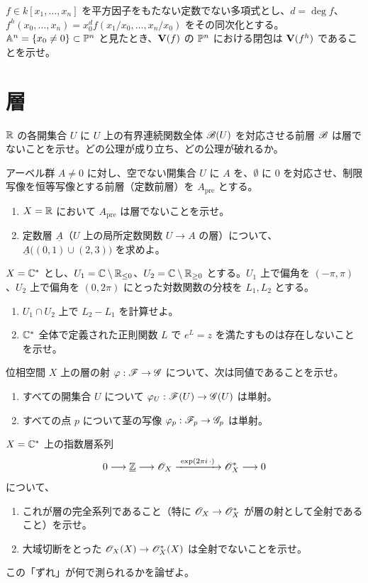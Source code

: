 $f\in k[x_1,\dots,x_n]$ を平方因子をもたない定数でない多項式とし、$d=\deg f$、$f^h(x_0,\dots,x_n)=x_0^d f(x_1/x_0,\dots,x_n/x_0)$ をその同次化とする。$\mathbb{A}^n=\{x_0\neq 0\}\subset\mathbb{P}^n$ と見たとき、$\mathbf{V}(f)$ の $\mathbb{P}^n$ における閉包は $\mathbf{V}(f^h)$ であることを示せ。

\section{層}

$\mathbb{R}$ の各開集合 $U$ に $U$ 上の有界連続関数全体 $\mathscr{B}(U)$ を対応させる前層 $\mathscr{B}$ は層でないことを示せ。どの公理が成り立ち、どの公理が破れるか。

アーベル群 $A\neq 0$ に対し、空でない開集合 $U$ に $A$ を、$\emptyset$ に $0$ を対応させ、制限写像を恒等写像とする前層（定数前層）を $A_{\mathrm{pre}}$ とする。
\begin{enumerate}
  \item $X=\mathbb{R}$ において $A_{\mathrm{pre}}$ は層でないことを示せ。
  \item 定数層 $\underline{A}$（$U$ 上の局所定数関数 $U\to A$ の層）について、$\underline{A}\bigl((0,1)\cup(2,3)\bigr)$ を求めよ。
\end{enumerate}

$X=\mathbb{C}^*$ とし、$U_1=\mathbb{C}\setminus\mathbb{R}_{\leq 0}$、$U_2=\mathbb{C}\setminus\mathbb{R}_{\geq 0}$ とする。$U_1$ 上で偏角を $(-\pi,\pi)$、$U_2$ 上で偏角を $(0,2\pi)$ にとった対数関数の分枝を $L_1,L_2$ とする。
\begin{enumerate}
  \item $U_1\cap U_2$ 上で $L_2-L_1$ を計算せよ。
  \item $\mathbb{C}^*$ 全体で定義された正則関数 $L$ で $e^{L}=z$ を満たすものは存在しないことを示せ。
\end{enumerate}

位相空間 $X$ 上の層の射 $\varphi:\mathscr{F}\to\mathscr{G}$ について、次は同値であることを示せ。
\begin{enumerate}
  \item すべての開集合 $U$ について $\varphi_U:\mathscr{F}(U)\to\mathscr{G}(U)$ は単射。
  \item すべての点 $p$ について茎の写像 $\varphi_p:\mathscr{F}_p\to\mathscr{G}_p$ は単射。
\end{enumerate}

$X=\mathbb{C}^*$ 上の指数層系列
\[
  0\longrightarrow \underline{\mathbb{Z}}\longrightarrow \mathscr{O}_X\xrightarrow{\ \exp(2\pi i\,\cdot)\ }\mathscr{O}_X^*\longrightarrow 0
\]
について、
\begin{enumerate}
  \item これが層の完全系列であること（特に $\mathscr{O}_X\to\mathscr{O}_X^*$ が層の射として全射であること）を示せ。
  \item 大域切断をとった $\mathscr{O}_X(X)\to\mathscr{O}_X^*(X)$ は全射でないことを示せ。
\end{enumerate}
この「ずれ」が何で測られるかを論ぜよ。

